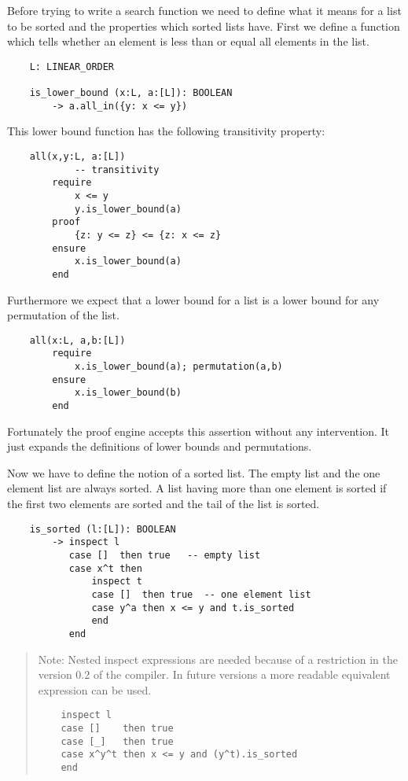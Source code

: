 Before trying to write a search function we need to define what it means for a
list to be sorted and the properties which sorted lists have. First we define
a function which tells whether an element is less than or equal all elements
in the list.



\begin{lstlisting}
    L: LINEAR_ORDER

    is_lower_bound (x:L, a:[L]): BOOLEAN
        -> a.all_in({y: x <= y})
\end{lstlisting}

This lower bound function has the following transitivity property:

\begin{lstlisting}
    all(x,y:L, a:[L])
            -- transitivity
        require
            x <= y
            y.is_lower_bound(a)
        proof
            {z: y <= z} <= {z: x <= z}
        ensure
            x.is_lower_bound(a)
        end
\end{lstlisting}

Furthermore we expect that a lower bound for a list is a lower bound for any
permutation of the list.

\begin{lstlisting}
    all(x:L, a,b:[L])
        require
            x.is_lower_bound(a); permutation(a,b)
        ensure
            x.is_lower_bound(b)
        end
\end{lstlisting}

Fortunately the proof engine accepts this assertion without any
intervention. It just expands the definitions of lower bounds and
permutations.



Now we have to define the notion of a sorted list. The empty list and the one
element list are always sorted. A list having more than one element is sorted
if the first two elements are sorted and the tail of the list is sorted.

\begin{lstlisting}
    is_sorted (l:[L]): BOOLEAN
        -> inspect l
           case []  then true   -- empty list
           case x^t then
               inspect t
               case []  then true  -- one element list
               case y^a then x <= y and t.is_sorted
               end
           end
\end{lstlisting}

\begin{quote}
  Note: Nested inspect expressions are needed because of a restriction in the
  version 0.2 of the compiler. In future versions a more readable equivalent
  expression can be used.
\begin{lstlisting}
    inspect l
    case []    then true
    case [_]   then true
    case x^y^t then x <= y and (y^t).is_sorted
    end  
\end{lstlisting}
\end{quote}

